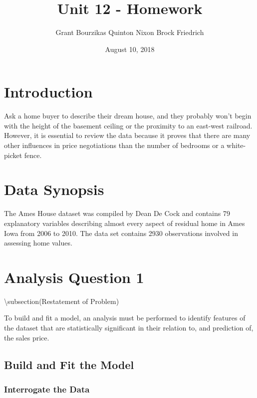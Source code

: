 \documentclass[11pt,]{article}
\title{Unit 12 - Homework}
\author{\textbar{} Grant Bourzikas \textbar{} Quinton Nixon \textbar{} Brock
Friedrich}
\date{August 10, 2018}
\begin{document}
\maketitle

{
\setcounter{tocdepth}{2}
\tableofcontents
}
\noindent\makebox[\linewidth]{\rule{\textwidth}{0.4pt}}

\section*{Introduction}

Ask a home buyer to describe their dream house, and they probably won't
begin with the height of the basement ceiling or the proximity to an
east-west railroad. However, it is essential to review the data because
it proves that there are many other influences in price negotiations
than the number of bedrooms or a white-picket fence.

\noindent\makebox[\linewidth]{\rule{\textwidth}{0.4pt}}

\section{Data Synopsis}

The Ames House dataset was compiled by Dean De Cock and contains 79
explanatory variables describing almost every aspect of residual home in
Ames Iowa from 2006 to 2010. The data set contains 2930 observations
involved in assessing home values.

\noindent\makebox[\linewidth]{\rule{\textwidth}{0.4pt}}

\section{Analysis Question 1}

\textbackslash{}subsection(Restatement of Problem)

To build and fit a model, an analysis must be performed to identify
features of the dataset that are statistically significant in their
relation to, and prediction of, the sales price.

\subsection{Build and Fit the Model}

\subsubsection{Interrogate the Data}
\end{document}
